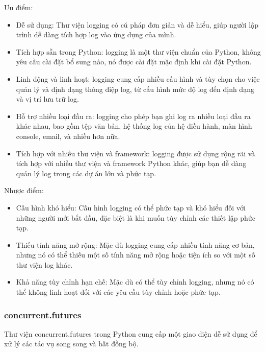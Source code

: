 \documentclass{article} %
\begin{document}
Ưu điểm:
\begin{itemize}
    \item Dễ sử dụng: Thư viện logging có cú pháp đơn giản và dễ hiểu, giúp người lập trình dễ dàng tích hợp log vào ứng dụng của mình.
    \item Tích hợp sẵn trong Python: logging là một thư viện chuẩn của Python, không yêu cầu cài đặt bổ sung nào, nó được cài đặt mặc định khi cài đặt Python.
    \item Linh động và linh hoạt: logging cung cấp nhiều cấu hình và tùy chọn cho việc quản lý và định dạng thông điệp log, từ cấu hình mức độ log đến định dạng và vị trí lưu trữ log.
    \item Hỗ trợ nhiều loại đầu ra: logging cho phép bạn ghi log ra nhiều loại đầu ra khác nhau, bao gồm tệp văn bản, hệ thống log của hệ điều hành, màn hình console, email, và nhiều hơn nữa.
    \item Tích hợp với nhiều thư viện và framework: logging được sử dụng rộng rãi và tích hợp với nhiều thư viện và framework Python khác, giúp bạn dễ dàng quản lý log trong các dự án lớn và phức tạp.
\end{itemize}
\hspace{0.0em} Nhược điểm:
\begin{itemize}
    \item Cấu hình khó hiểu: Cấu hình logging có thể phức tạp và khó hiểu đối với những người mới bắt đầu, đặc biệt là khi muốn tùy chỉnh các thiết lập phức tạp.
    \item Thiếu tính năng mở rộng: Mặc dù logging cung cấp nhiều tính năng cơ bản, nhưng nó có thể thiếu một số tính năng mở rộng hoặc tiện ích so với một số thư viện log khác.
    \item Khả năng tùy chỉnh hạn chế: Mặc dù có thể tùy chỉnh logging, nhưng nó có thể không linh hoạt đối với các yêu cầu tùy chỉnh hoặc phức tạp.
\end{itemize}
\subsubsection{concurrent.futures}
Thư viện concurrent.futures trong Python cung cấp một giao diện dễ sử dụng để xử lý các tác vụ song song và bất đồng bộ.
\end{document}
